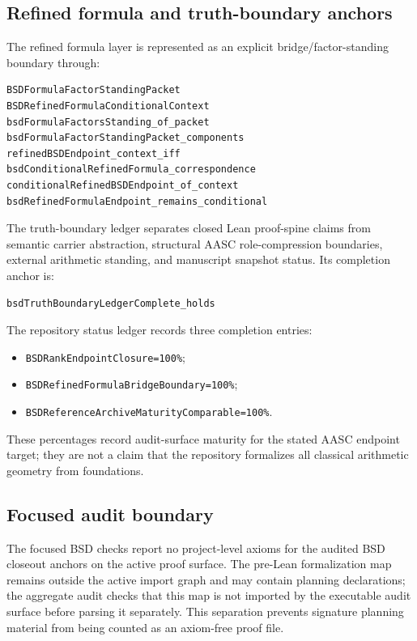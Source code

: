\documentclass[11pt]{article}
\begin{document}
\subsection{Refined formula and truth-boundary anchors}
The refined formula layer is represented as an explicit bridge/factor-standing boundary through:
\begin{verbatim}
BSDFormulaFactorStandingPacket
BSDRefinedFormulaConditionalContext
bsdFormulaFactorsStanding_of_packet
bsdFormulaFactorStandingPacket_components
refinedBSDEndpoint_context_iff
bsdConditionalRefinedFormula_correspondence
conditionalRefinedBSDEndpoint_of_context
bsdRefinedFormulaEndpoint_remains_conditional
\end{verbatim}
The truth-boundary ledger separates closed Lean proof-spine claims from semantic carrier abstraction, structural AASC role-compression boundaries, external arithmetic standing, and manuscript snapshot status. Its completion anchor is:
\begin{verbatim}
bsdTruthBoundaryLedgerComplete_holds
\end{verbatim}
The repository status ledger records three completion entries:
\begin{itemize}
\item \texttt{BSDRankEndpointClosure=100\%};
\item \texttt{BSDRefinedFormulaBridgeBoundary=100\%};
\item \texttt{BSDReferenceArchiveMaturityComparable=100\%}.
\end{itemize}
These percentages record audit-surface maturity for the stated AASC endpoint target; they are not a claim that the repository formalizes all classical arithmetic geometry from foundations.

\subsection{Focused audit boundary}
The focused BSD checks report no project-level axioms for the audited BSD closeout anchors on the active proof surface. The pre-Lean formalization map remains outside the active import graph and may contain planning declarations; the aggregate audit checks that this map is not imported by the executable audit surface before parsing it separately. This separation prevents signature planning material from being counted as an axiom-free proof file.
\end{document}
